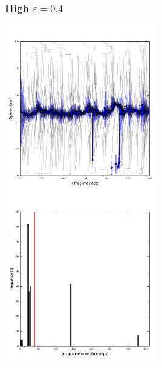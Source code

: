 \documentclass[10pt]{beamer}
\begin{document}
\begin{frame}\frametitle{High $\varepsilon=0.4$}
    \begin{center}
        \includegraphics[width=0.5\textwidth]{fig/evol_04.pdf}
        \includegraphics[width=0.5\textwidth]{fig/var_04.pdf}
    \end{center}


\end{frame}
\end{document}
